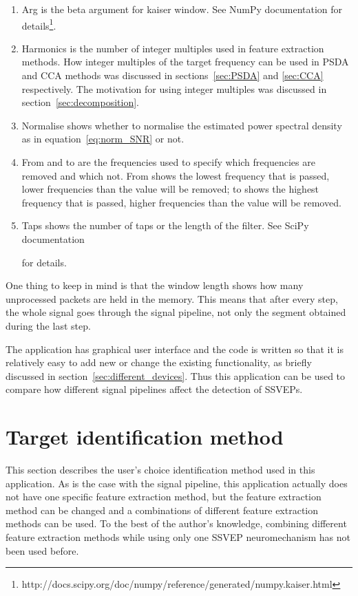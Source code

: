 \begin{enumerate}
	\item Arg is the beta argument for kaiser window. See NumPy documentation for details\footnote{http://docs.scipy.org/doc/numpy/reference/generated/numpy.kaiser.html}.
	\item Harmonics is the number of integer multiples used in \gls{feature extraction} methods. How integer multiples of the \gls{target} frequency can be used in \gls{PSDA} and \gls{CCA} methods was discussed in sections~\ref{sec:PSDA} and \ref{sec:CCA} respectively. The motivation for using integer multiples was discussed in section~\ref{sec:decomposition}.
	\item Normalise shows whether to normalise the estimated \gls{power spectral density} as in equation~\ref{eq:norm_SNR} or not.
	\item From and to are the frequencies used to specify which frequencies are removed and which not. From shows the lowest frequency that is passed, lower frequencies than the value will be removed; to shows the highest frequency that is passed, higher frequencies than the value will be removed.
	\item Taps shows the number of taps or the length of the filter. See SciPy documentation\addtocounter{footnote}{-2}\footnotemark\addtocounter{footnote}{1} for details.
\end{enumerate}

One thing to keep in mind is that the window length shows how many unprocessed packets are held in the memory. This means that after every step, the whole signal goes through the signal pipeline, not only the segment obtained during the last step.

The application has graphical user interface and the code is written so that it is relatively easy to add new or change the existing functionality, as briefly discussed in section~\ref{sec:different_devices}. Thus this application can be used to compare how different signal pipelines affect the detection of \glspl{SSVEP}.

\section{Target identification method}
\label{sec:identification}

This section describes the user's choice identification method used in this application. As is the case with the signal pipeline, this application actually does not have one specific \gls{feature extraction} method, but the \gls{feature extraction} method can be changed and a combinations of different \gls{feature extraction} methods can be used. To the best of the author's knowledge, combining different \gls{feature extraction} methods while using only one \gls{SSVEP} neuromechanism has not been used before.

